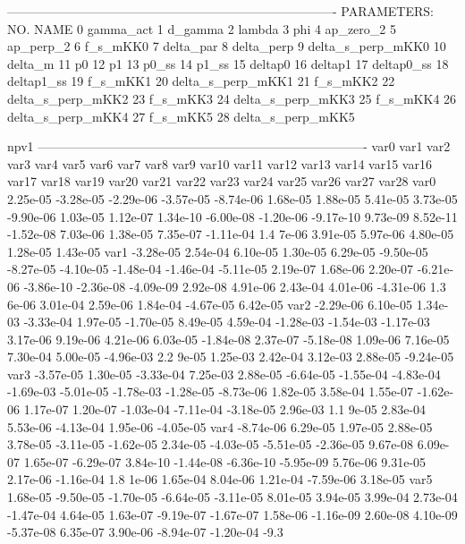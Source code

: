 -------------------------------------------------------------------------------
 PARAMETERS:
    NO.   NAME      
     0 gamma_act    
     1 d_gamma      
     2 lambda      
     3 phi         
     4 ap_zero_2   
     5 ap_perp_2   
     6 f_s_mKK0    
     7 delta_par  
     8 delta_perp 
     9 delta_s_perp_mKK0 
    10 delta_m      
    11 p0          
    12 p1          
    13 p0_ss       
    14 p1_ss       
    15 deltap0    
    16 deltap1    
    17 deltap0_ss 
    18 deltap1_ss 
    19 f_s_mKK1   
    20 delta_s_perp_mKK1 
    21 f_s_mKK2    
    22 delta_s_perp_mKK2 
    23 f_s_mKK3    
    24 delta_s_perp_mKK3 
    25 f_s_mKK4    
    26 delta_s_perp_mKK4 
    27 f_s_mKK5    
    28 delta_s_perp_mKK5 


npv1
-------------------------------------------------------------------------------
var0 var1 var2 var3 var4 var5 var6 var7 var8 var9 var10 var11 var12 var13 var14 var15 var16 var17 var18 var19 var20 var21 var22 var23 var24 var25 var26 var27 var28 
var0  2.25e-05 -3.28e-05 -2.29e-06 -3.57e-05 -8.74e-06  1.68e-05  1.88e-05  5.41e-05  3.73e-05 -9.90e-06  1.03e-05  1.12e-07  1.34e-10 -6.00e-08 -1.20e-06 -9.17e-10  9.73e-09  8.52e-11 -1.52e-08  7.03e-06  1.38e-05  7.35e-07 -1.11e-04  1.4
7e-06  3.91e-05  5.97e-06  4.80e-05  1.28e-05  1.43e-05
var1 -3.28e-05  2.54e-04  6.10e-05  1.30e-05  6.29e-05 -9.50e-05 -8.27e-05 -4.10e-05 -1.48e-04 -1.46e-04 -5.11e-05  2.19e-07  1.68e-06  2.20e-07 -6.21e-06 -3.86e-10 -2.36e-08 -4.09e-09  2.92e-08  4.91e-06  2.43e-04  4.01e-06 -4.31e-06  1.3
6e-06  3.01e-04  2.59e-06  1.84e-04 -4.67e-05  6.42e-05
var2 -2.29e-06  6.10e-05  1.34e-03 -3.33e-04  1.97e-05 -1.70e-05  8.49e-05  4.59e-04 -1.28e-03 -1.54e-03 -1.17e-03  3.17e-06  9.19e-06  4.21e-06  6.03e-05 -1.84e-08  2.37e-07 -5.18e-08  1.09e-06  7.16e-05  7.30e-04  5.00e-05 -4.96e-03  2.2
9e-05  1.25e-03  2.42e-04  3.12e-03  2.88e-05 -9.24e-05
var3 -3.57e-05  1.30e-05 -3.33e-04  7.25e-03  2.88e-05 -6.64e-05 -1.55e-04 -4.83e-04 -1.69e-03 -5.01e-05 -1.78e-03 -1.28e-05 -8.73e-06  1.82e-05  3.58e-04  1.55e-07 -1.62e-06  1.17e-07  1.20e-07 -1.03e-04 -7.11e-04 -3.18e-05  2.96e-03  1.1
9e-05  2.83e-04  5.53e-06 -4.13e-04  1.95e-06 -4.05e-05
var4 -8.74e-06  6.29e-05  1.97e-05  2.88e-05  3.78e-05 -3.11e-05 -1.62e-05  2.34e-05 -4.03e-05 -5.51e-05 -2.36e-05  9.67e-08  6.09e-07  1.65e-07 -6.29e-07  3.84e-10 -1.44e-08 -6.36e-10 -5.95e-09  5.76e-06  9.31e-05  2.17e-06 -1.16e-04  1.8
1e-06  1.65e-04  8.04e-06  1.21e-04 -7.59e-06  3.18e-05
var5  1.68e-05 -9.50e-05 -1.70e-05 -6.64e-05 -3.11e-05  8.01e-05  3.94e-05  3.99e-04  2.73e-04 -1.47e-04  4.64e-05  1.63e-07 -9.19e-07 -1.67e-07  1.58e-06 -1.16e-09  2.60e-08  4.10e-09 -5.37e-08  6.35e-07  3.90e-06 -8.94e-07 -1.20e-04 -9.3
